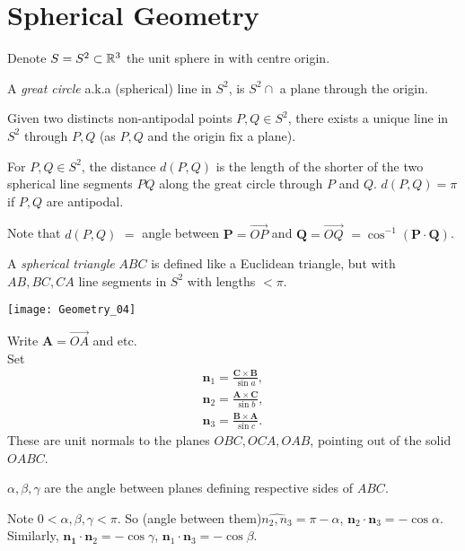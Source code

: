 \documentclass[a4paper]{article}
\begin{document}
\newpage

\section{Spherical Geometry}
Denote $S=S^2 \subset \mathbb{R}^3$ the unit sphere in with centre origin.

\begin{defi}
A \emph{great circle} a.k.a (spherical) line in $S^2$, is $S^2 \cap$ a plane through the origin.
\end{defi}

Given two distincts non-antipodal points $P,Q \in S^2$, there exists a unique line in $S^2$ through $P,Q$ (as $P,Q$ and the origin fix a plane).

\begin{defi}
For $P,Q \in S^2$, the distance $d(P,Q)$ is the length of the shorter of the two spherical line segments $PQ$ along the great circle through $P$ and $Q$. $d(P,Q) = \pi$ if $P,Q$ are antipodal.
\end{defi}

Note that $d(P,Q)$ $=$ angle between $\mathbf{P} = \vec{OP}$ and $\mathbf{Q} = \vec{OQ}$ $= \cos^{-1} (\mathbf{P} \cdot \mathbf{Q})$.

A \emph{spherical triangle} $ABC$ is defined like a Euclidean triangle, but with $AB,BC,CA$ line segments in $S^2$ with lengths $<\pi$.

\texttt{[image: Geometry\_04]}

\begin{notation}
Write $\mathbf{A} = \vec{OA}$ and etc.\\
Set
\begin{equation*}
\begin{aligned}
\mathbf{n}_1 = \frac{\mathbf{C} \times \mathbf{B}}{\sin a},\\
\mathbf{n}_2 = \frac{\mathbf{A} \times \mathbf{C}}{\sin b},\\
\mathbf{n}_3 = \frac{\mathbf{B} \times \mathbf{A}}{\sin c}.
\end{aligned}
\end{equation*}
These are unit normals to the planes $OBC,OCA,OAB$, pointing out of the solid $OABC$.

$\alpha,\beta,\gamma$ are the angle between planes defining respective sides of $ABC$.

Note $0<\alpha,\beta,\gamma < \pi$. So (angle between them)$\widehat{n_2,n_3} = \pi - \alpha$, $\mathbf{n}_2 \cdot \mathbf{n}_3 = -\cos \alpha$. Similarly, $\mathbf{n_1} \cdot \mathbf{n}_2 = -\cos \gamma$, $\mathbf{n}_1 \cdot \mathbf{n}_3 = -\cos \beta$.
\end{notation}
\end{document}
